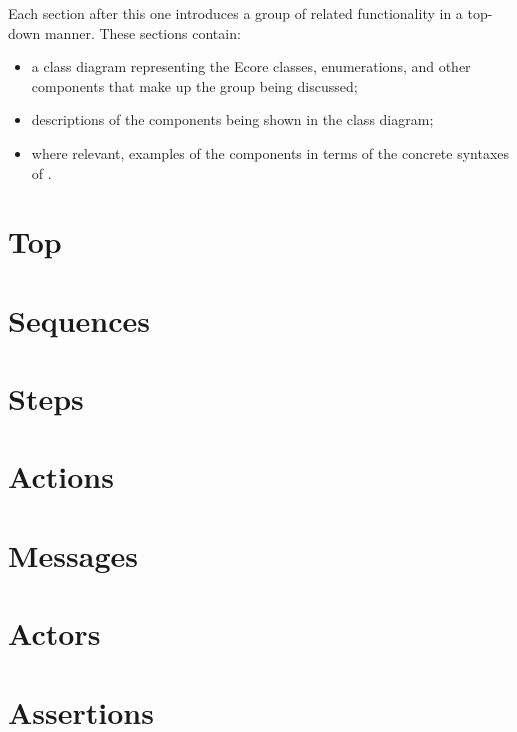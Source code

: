 Each section after this one introduces a group of related \langname{}
functionality in a top-down manner.  These sections contain:

\begin{itemize}
\item
	a class diagram representing the Ecore classes, enumerations, and other
	components that make up the group being discussed;
\item
	descriptions of the components being shown in the class diagram;
\item
	where relevant, examples of the components in terms of the concrete
	syntaxes of \langname.
\end{itemize}

\section{Top}\label{sec:metamodel-top}


\section{Sequences}\label{sec:metamodel-sequences}


\section{Steps}\label{sec:metamodel-steps}


\section{Actions}\label{sec:metamodel-actions}


\section{Messages}\label{sec:metamodel-messages}


\section{Actors}\label{sec:metamodel-actors}


\section{Assertions}\label{sec:metamodel-assertions}




